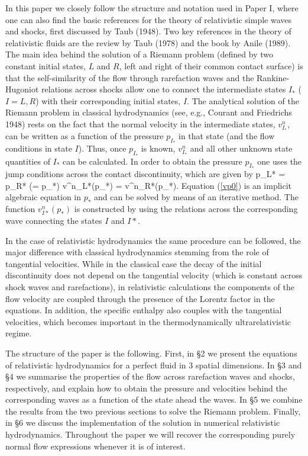   In this paper we closely follow the structure and notation used in
Paper I, where one can also find the basic references for the theory
of relativistic simple waves and shocks, first discussed by Taub
(1948). Two key references in the theory of relativistic fluids are
the review by Taub (1978) and the book by Anile (1989).  The main idea
behind the solution of a Riemann problem (defined by two constant
initial states, $L$ and $R$, left and right of their common contact
surface) is that the self-similarity of the flow through rarefaction
waves and the Rankine-Hugoniot relations across shocks allow one to
connect the intermediate states $I_*$ ($I = L,R$) with their
corresponding initial states, $I$.  The analytical solution of the
Riemann problem in classical hydrodynamics (see, e.g., Courant and
Friedrichs 1948) rests on the fact that the normal velocity in the
intermediate states, $v^n_{I_*}$, can be written as a function of the
pressure $p_{I_*}$ in that state (and the flow conditions in state
$I$). Thus, once $p_{I_*}$ is known, $v^n_{I_*}$ and all other unknown
state quantities of $I_*$ can be calculated. In order to obtain the
pressure $p_{I_*}$ one uses the jump conditions across the contact
discontinuity, which are given by
\be
p_{L*} = p_{R*} (= p_*)
\ee                                         
\be
v^n_{L*}(p_*) = v^n_{R*}(p_*).
\label{vp0}
\ee
Equation (\ref{vp0}) is an implicit algebraic equation in $p_*$ and
can be solved by means of an iterative method. The function
$v^n_{I*}(p_*)$ is constructed by using the relations across the
corresponding wave connecting the states $I$ and $I*$.

  In the case of relativistic hydrodynamics the same procedure can be
followed, the major difference with classical hydrodynamics stemming
from the role of tangential velocities. While in the classical case
the decay of the initial discontinuity does not depend on the
tangential velocity (which is constant across shock waves and
rarefactions), in relativistic calculations the components of the flow
velocity are coupled through the presence of the Lorentz factor in the
equations. In addition, the specific enthalpy also couples with the
tangential velocities, which becomes important in the
thermodynamically ultrarelativistic regime.

  The structure of the paper is the following. First, in \S2 we
present the equations of relativistic hydrodynamics for a perfect
fluid in 3 spatial dimensions. In \S3 and \S4 we summarise the
properties of the flow across rarefaction waves and shocks,
respectively, and explain how to obtain the pressure and velocities
behind the corresponding waves as a function of the state ahead the
waves. In \S5 we combine the results from the two previous sections to
solve the Riemann problem. Finally, in \S6 we discuss the
implementation of the solution in numerical relativistic
hydrodynamics.  Throughout the paper we will recover the corresponding
purely normal flow expressions whenever it is of interest.


